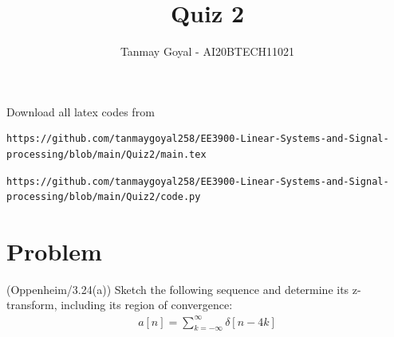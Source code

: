\documentclass[journal,12pt,twocolumn]{IEEEtran}
\begin{document}
\def\putbox#1#2#3{\makebox[0in][l]{\makebox[#1][l]{}\raisebox{\baselineskip}[0in][0in]{\raisebox{#2}[0in][0in]{#3}}}}
     \def\rightbox#1{\makebox[0in][r]{#1}}
     \def\centbox#1{\makebox[0in]{#1}}
     \def\topbox#1{\raisebox{-\baselineskip}[0in][0in]{#1}}
     \def\midbox#1{\raisebox{-0.5\baselineskip}[0in][0in]{#1}}
\vspace{3cm}
\title{Quiz 2}
\author{Tanmay Goyal - AI20BTECH11021}
\maketitle
\newpage
\bigskip
\renewcommand{\thefigure}{\theenumi}
\renewcommand{\thetable}{\theenumi}

Download all latex codes from 
\begin{lstlisting}
https://github.com/tanmaygoyal258/EE3900-Linear-Systems-and-Signal-processing/blob/main/Quiz2/main.tex
\end{lstlisting}
\begin{lstlisting}
https://github.com/tanmaygoyal258/EE3900-Linear-Systems-and-Signal-processing/blob/main/Quiz2/code.py
\end{lstlisting}
\section{Problem}
(Oppenheim/3.24(a)) Sketch the following sequence and determine its z-transform, including its region of convergence:
\begin{align}
    a[n] = \sum_{k = -\infty}^\infty \delta[n-4k]
\end{align}
\end{document}
